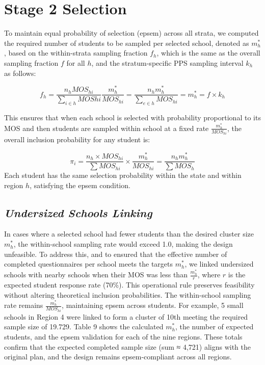 \documentclass[
  12pt]{article}
\begin{document}
\section{Stage 2 Selection}\label{stage-2-selection}

To maintain equal probability of selection (epsem) across all strata, we
computed the required number of students to be sampled per selected
school, denoted as \(m^*_h\) , based on the within-strata sampling
fraction \(f_h\), which is the same as the overall sampling fraction
\(f\) for all \(h\), and the stratum-specific PPS sampling interval
\(k_h\) as follows:

\[
f_h = \frac{n_h MOS_{hi} }{\sum_{i \in h} MOS{hi} } \frac{m^*_h}{MOS_{hi}}
 = \frac{n_h m^*_h}{\sum_{e \in h}MOS_{hi}} = m^*_h = f \times k_h
\]

This ensures that when each school is selected with probability
proportional to its MOS and then students are sampled within school at a
fixed rate \(\frac{m^*_h}{MOS_{hi}}\), the overall inclusion probability
for any student is:

\[
\pi_{i} = \frac{n_h \times MOS_{hi}}{\sum MOS_{hi}} \times \frac{m^*_h}{MOS_{hi}} = \frac{n_h m^*_h}{\sum MOS_h} 
\]Each student has the same selection probability within the state and
within region \(h\), satisfying the epsem condition.

\subsection{\texorpdfstring{\emph{Undersized Schools
Linking}}{Undersized Schools Linking}}\label{undersized-schools-linking}

In cases where a selected school had fewer students than the desired
cluster size \(m^*_h\), the within-school sampling rate would exceed
1.0, making the design unfeasible. To address this, and to ensured that
the effective number of completed questionnaires per school meets the
targets \(m^*_h\), we linked undersized schools with nearby schools when
their MOS was less than \(\frac{m^*_h}{r}\), where \(r\) is the expected
student response rate (70\%). This operational rule preserves
feasibility without altering theoretical inclusion probabilities. The
within-school sampling rate remains \(\frac{m^*_h}{MOS_{hi}}\),
maintaining epsem across students. For example, 5 small schools in
Region 4 were linked to form a cluster of 10th meeting the required
sample size of 19.729. Table 9 shows the calculated \(m^*_h\), the
number of expected students, and the epsem validation for each of the
nine regions. These totals confirm that the expected completed sample
size (sum ≈ 4,721) aligns with the original plan, and the design remains
epsem-compliant across all regions.
\end{document}
